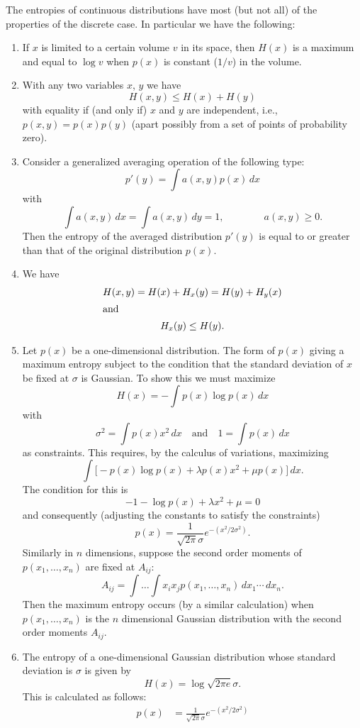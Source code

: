 The entropies of
continuous distributions have most (but not all) of the
properties of the discrete case.  In particular we have the following:
\begin{enumerate}
\item
If $x$ is limited to a certain volume $v$ in its space, then $H(x)$ is a
maximum and equal to $\log v$ when $p(x)$ is constant
($1/v$) in the volume.
\item
With any two variables $x$, $y$ we have
$$
H(x,y)\leq H(x)+H(y)
$$
with equality if (and only if) $x$ and $y$ are independent, i.e.,
$p(x,y)=p(x)p(y)$ (apart possibly from a set of points of probability
zero).
\item
Consider a generalized averaging operation of the following type:
$$
p'(y)=\int a(x,y)p(x)\,dx
$$
with
$$
\int a(x,y)\,dx=\int a(x,y)\,dy=1,\qquad\qquad a(x,y)\geq0.
$$
Then the entropy of the averaged distribution $p'(y)$ is equal to or
greater than that of the original distribution $p(x)$.
\item
We have
\begin{gather*}
H(x,y)=H(x)+H_x(y)=H(y)+H_y(x)\\
\intertext{and}
H_x(y)\leq H(y).
\end{gather*}
\item
Let $p(x)$ be a one-dimensional distribution.  The form of $p(x)$ giving
a maximum entropy subject to the condition that the standard deviation
of $x$ be fixed at $\sigma$ is Gaussian.  To show this we must maximize
$$
H(x)=-\int p(x)\log p(x)\,dx
$$
with
$$
\sigma^2=\int p(x)x^2\,dx\quad\text{and}\quad 1=\int p(x)\,dx
$$
as constraints.  This requires, by the calculus of variations, maximizing
$$
\int\bigl[-p(x)\log p(x)+\lambda p(x)x^2+\mu p(x)\bigr]\,dx.
$$
The condition for this is
$$
-1-\log p(x)+\lambda x^2+\mu=0
$$
and consequently (adjusting the constants to satisfy the constraints)
$$
p(x)=\frac{1}{\sqrt{2\pi}\sigma} e^{-(x^2/2\sigma^2)}.
$$
Similarly in $n$ dimensions, suppose the second order moments of
$p(x_1,\dots,x_n)$ are fixed at $A_{ij}$:
$$
A_{ij}=\int\dots\int x_i x_j p(x_1,\dots,x_n)\,dx_1\dotsm\, dx_n.
$$
Then the maximum entropy occurs (by a similar calculation) when
$p(x_1,\dots,x_n)$ is the $n$ dimensional Gaussian distribution with the
second order moments $A_{ij}$.
\item
The entropy of a one-dimensional Gaussian distribution whose standard
deviation is $\sigma$ is given by
$$
H(x)=\log\sqrt{2\pi e}\sigma.
$$
This is calculated as follows:
\begin{align*}
p(x)&=\frac{1}{\sqrt{2\pi}\sigma}e^{-(x^2/2\sigma^2)}\\

\end{align*}
\end{enumerate}
